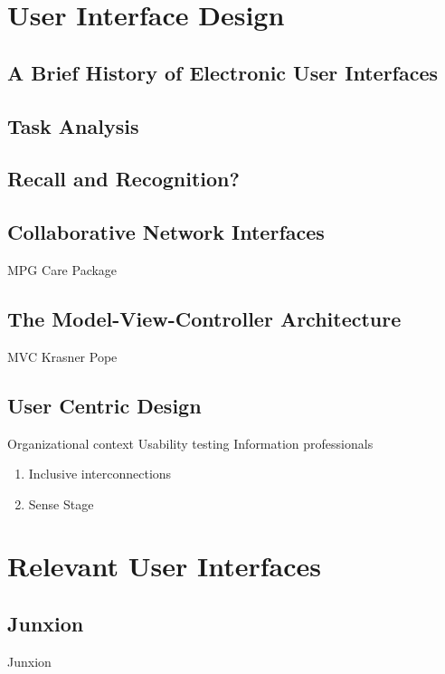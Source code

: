 			\section{User Interface Design}

	\subsection{A Brief History of Electronic User Interfaces}
	\subsection{Task Analysis}
	\subsection{Recall and Recognition?}
	\subsection{Collaborative Network Interfaces}
		MPG Care Package 
	\subsection{The Model-View-Controller Architecture}
		MVC Krasner Pope 
	\subsection{User Centric Design}
		Organizational context 
		Usability testing 
		Information professionals 
	\begin{enumerate}
		\item Inclusive interconnections 
		\item Sense Stage 
	\end{enumerate}

			\section{Relevant User Interfaces}

	\subsection{Junxion}
		Junxion 
